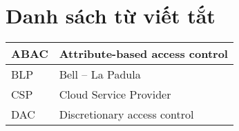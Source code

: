 \chapter*{\centering\Large{Danh sách từ viết tắt}}
\begin{tabular}{| p{} |p{} |}
\hline
        ABAC &  Attribute-based access control\\
        \hline
        BLP & Bell – La Padula \\
        \hline
        CSP & Cloud Service Provider \\
        \hline
        DAC & Discretionary access control \\
        \hline
\end{tabular} \\



